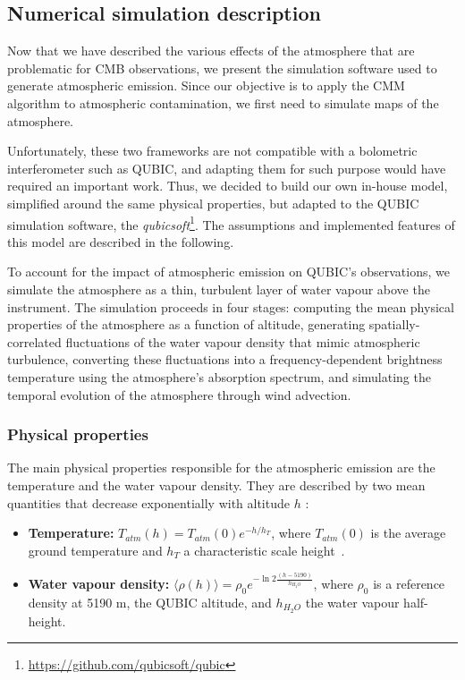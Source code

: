 \documentclass[a4paper,11pt]{article}
\begin{document}
\subsection{Numerical simulation description}
\label{sec:atm_simulations}

Now that we have described the various effects of the atmosphere that are problematic for CMB observations, we present the simulation software used to generate atmospheric emission. Since our objective is to apply the CMM algorithm to atmospheric contamination, we first need to simulate maps of the atmosphere.

Unfortunately, these two frameworks are not compatible with a bolometric interferometer such as QUBIC, and adapting them for such purpose would have required an important work. Thus, we decided to build our own in-house model, simplified around the same physical properties, but adapted to the QUBIC simulation software, the \emph{qubicsoft}\footnote{\url{https://github.com/qubicsoft/qubic}}. The assumptions and implemented features of this model are described in the following.

To account for the impact of atmospheric emission on QUBIC's observations, we simulate the atmosphere as a thin, turbulent layer of water vapour above the instrument. The simulation proceeds in four stages: computing the mean physical properties of the atmosphere as a function of altitude, generating spatially-correlated fluctuations of the water vapour density that mimic atmospheric turbulence, converting these fluctuations into a frequency-dependent brightness temperature using the atmosphere's absorption spectrum, and simulating the temporal evolution of the atmosphere through wind advection.

\subsubsection{Physical properties}

The main physical properties responsible for the atmospheric emission are the temperature and the water vapour density. They are described by two mean quantities that decrease exponentially with altitude $h$ :

\begin{itemize}
    \item \textbf{Temperature: } $T_{atm}(h) = T_{atm}(0) e^{-h/h_T}$, where $T_{atm}(0)$ is the average ground temperature and $h_T$ a characteristic scale height~\cite{morris2022}.
    \item \textbf{Water vapour density: } $\langle \rho(h) \rangle = \rho_0 e^{-\ln 2 \frac{(h-5190)}{h_{H_2O}}}$, where $\rho_0$ is a reference density at 5190 m, the QUBIC altitude, and $h_{H_2O}$ the water vapour half-height.
\end{itemize}
\end{document}
